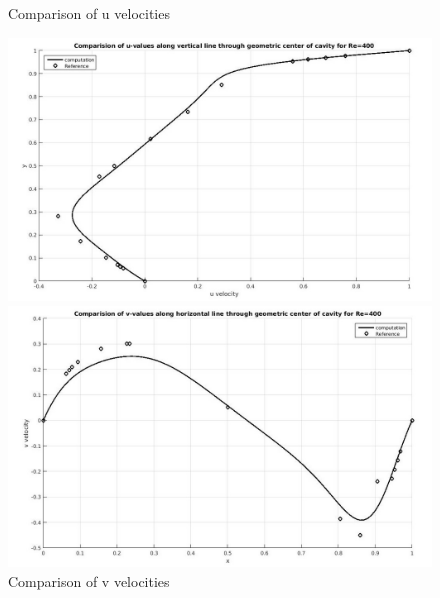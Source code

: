 \documentclass[12pt]{elsarticle}
\begin{document}
	\begin{figure}[h]
		\caption{Comparison of u velocities}
		\centering\includegraphics[width=0.7\linewidth]{37_uvel_re_400_comparision}
		\caption{Comparison of v velocities}
		\centering\includegraphics[width=0.7\linewidth]{38_vvel_re_400_comparision}
	\end{figure}
	\clearpage
	
\end{document}
